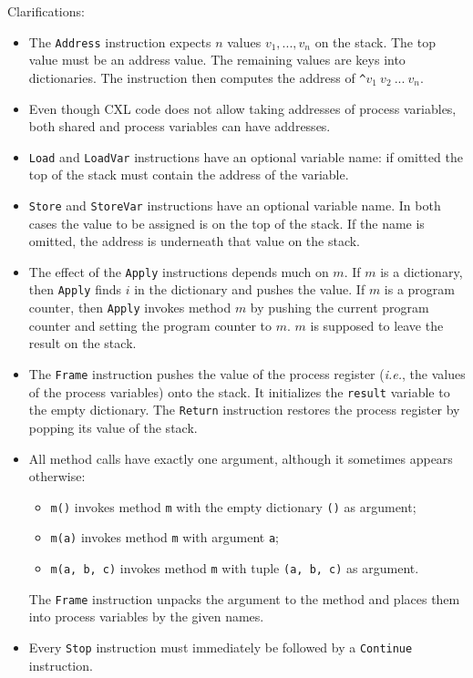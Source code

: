 \documentclass{report}
\begin{document}
\vspace{1em}

Clarifications:
\begin{itemize}
\item The \texttt{Address} instruction expects $n$ values $v_1, ..., v_n$ on the stack.
The top value must be an address value.  The remaining values are keys into dictionaries.
The instruction then computes the address of \texttt{\^}$v_1~v_2~...~v_n$.
\item Even though CXL code does not allow taking addresses of process variables, both
shared and process variables can have addresses.
\item \texttt{Load} and \texttt{LoadVar} instructions have an optional
variable name: if omitted the top of the stack must contain the address of
the variable.
\item \texttt{Store} and \texttt{StoreVar} instructions have an optional
variable name.  In both cases the value to be assigned is on the top
of the stack.  If the name is omitted, the address is underneath that
value on the stack.
\item The effect of the \texttt{Apply} instructions depends much on $m$.
If $m$ is a dictionary, then \texttt{Apply} finds $i$ in the dictionary
and pushes the value.
If $m$ is a program counter, then \texttt{Apply} invokes method $m$ by
pushing the current program counter and setting the program counter to
$m$.  $m$ is supposed to leave the result on the stack.
\item The \texttt{Frame} instruction pushes the value of the process
register (\emph{i.e.}, the values of the process variables) onto the
stack.  It initializes the \texttt{result} variable to the empty dictionary.
The \texttt{Return} instruction restores the process register by popping
its value of the stack.
\item All method calls have exactly one argument, although it sometimes
appears otherwise:
\begin{itemize}
\item \texttt{m()} invokes method \texttt{m} with the empty dictionary \texttt{()} as argument;
\item \texttt{m(a)} invokes method \texttt{m} with argument \texttt{a};
\item \texttt{m(a, b, c)} invokes method \texttt{m} with tuple \texttt{(a, b, c)} as argument.
\end{itemize}
The \texttt{Frame} instruction unpacks the argument to the method and places them into process variables by the given names.
\item Every \texttt{Stop} instruction must immediately be followed by a 
\texttt{Continue} instruction.
\end{itemize}
\end{document}
